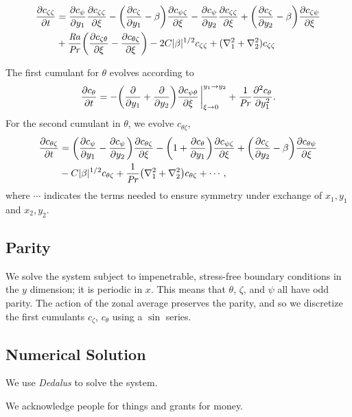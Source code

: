 \documentclass{jfm}
\newcommand{\cz}{c_{\zeta}}
\newcommand{\cs}{c_{\psi}}
\newcommand{\ct}{c_{\theta}}
\newcommand{\csz}{c_{\psi \zeta}}
\newcommand{\czs}{c_{\zeta \psi}}
\newcommand{\czz}{c_{\zeta \zeta}}
\newcommand{\ctz}{c_{\theta \zeta}}
\newcommand{\czt}{c_{\zeta \theta}}
\newcommand{\cst}{c_{\psi \theta}}
\newcommand{\cts}{c_{\theta \psi}}
\newcommand{\Ray}{\mbox{\textit{Ra}}}  %
\begin{document}
\begin{equation}
  \label{eq:czz}
  \begin{split}
    \pdv{\czz}{t} &= \pdv{\cs}{y_1} \pdv{\czz}{\xi} - \qty(\pdv{\cz}{y_1} - \beta) \pdv{\csz}{\xi} - \pdv{\cs}{y_2} \pdv{\czz}{\xi}  + \qty(\pdv{\cz}{y_2} - \beta) \pdv{\czs}{\xi}\\
    &+ \frac{\Ray}{\Pran} \qty(\pdv{\czt}{\xi} -  \pdv{\ctz}{\xi}) - 2C |\beta|^{1/2} \czz + (\nabla_1^2 + \nabla_2^2) \czz    
  \end{split}
\end{equation}

The first cumulant for $\theta$ evolves according to
\begin{equation}
  \label{eq:ct}
  \pdv{\ct}{t} = - \qty(\pdv{y_1} + \pdv{y_2}) \pdv{\cst}{\xi} \eval_{\xi \to 0}^{y_1 \to y_2} + \frac{1}{\Pran} \pdv[2]{\ct}{y_1}.
\end{equation}
For the second cumulant in $\theta$, we evolve $\ctz$,
\begin{equation}
  \label{eq:ctz}
  \begin{split}
    \pdv{\ctz}{t} &= \qty(\pdv{\cs}{y_1} - \pdv{\cs}{y_2}) \pdv{\ctz}{\xi} - \qty(1 + \pdv{\ct}{y_1}) \pdv{\csz}{\xi} + \qty(\pdv{\cz}{y_2} - \beta) \pdv{\cts}{\xi}\\
    &  - C |\beta|^{1/2} \ctz + \frac{1}{\Pran}\qty(\nabla_1^2 + \nabla_2^2) \ctz + \cdots,    
  \end{split}
\end{equation}
where $\cdots$ indicates the terms needed to ensure symmetry under exchange of $x_1, y_1$ and $x_2, y_2$.

\subsection{Parity}
\label{sec:parity}

We solve the system subject to impenetrable, stress-free boundary conditions in the $y$ dimension; it is periodic in $x$. This means that $\theta$, $\zeta$, and $\psi$ all have odd parity. The action of the zonal average preserves the parity, and so we discretize the first cumulants $\cz$, $\ct$ using a $\sin$ series. 


\subsection{Numerical Solution}
\label{sec:numerical-solution}

We use \emph{Dedalus} to solve the system.


We acknowledge people for things and grants for money. 



\end{document}
